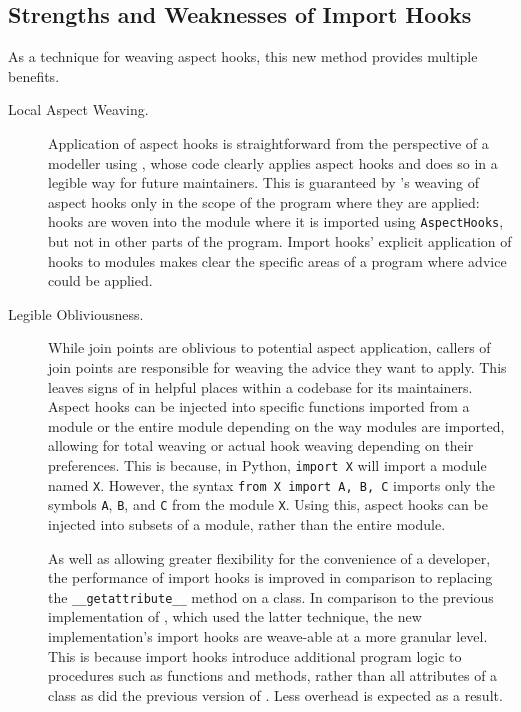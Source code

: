 \subsection{Strengths and Weaknesses of Import Hooks}\label{subsec:pdsf3importhooklimitations}

As a technique for weaving aspect hooks, this new method provides multiple
benefits.

\begin{description}
    \item[Local Aspect Weaving.] Application of aspect hooks is straightforward
        from the perspective of a modeller using \pdsf{}, whose code clearly
        applies aspect hooks and does so in a legible way for future
        maintainers. This is guaranteed by \pdsf{}'s weaving of aspect hooks
        only in the scope of the program where they are applied: hooks are woven
        into the module where it is imported using \lstinline{AspectHooks}, but
        not in other parts of the program. Import hooks' explicit application of
        hooks to modules makes clear the specific areas of a program where
        advice could be applied.

    \item[Legible Obliviousness.] While join points are oblivious to potential
        aspect application, callers of join points are responsible for weaving
        the advice they want to apply. This leaves signs of \aspectorientation{}
        in helpful places within a codebase for its maintainers. Aspect hooks
        can be injected into specific functions imported from a module or the
        entire module depending on the way modules are imported, allowing for
        total weaving or actual hook weaving depending on their preferences.
        This is because, in Python, \lstinline{import X} will import a module
        named \lstinline{X}. However, the syntax \lstinline{from X import A, B, C} imports only
        the symbols \lstinline{A}, \lstinline{B}, and \lstinline{C} from the
        module \lstinline{X}. Using this, aspect hooks can be injected into
        subsets of a module, rather than the entire module.
        
        As well as allowing greater flexibility for the convenience of a
        developer, the performance of import hooks is improved in comparison to
        replacing the \lstinline{__getattribute__} method on a class. In
        comparison to the previous implementation of \pdsf{}, which used the
        latter technique, the new implementation's import hooks are weave-able
        at a more granular level. This is because import hooks introduce
        additional program logic to procedures such as functions and methods,
        rather than all attributes of a class as did the previous version of
        \pdsf{}. Less overhead is expected as a result.


\end{description}
